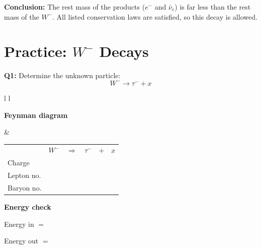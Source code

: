 \documentclass[12pt]{article}
\begin{document}
\vspace{0.9cm}

\textbf{Conclusion:} The rest mass of the products ($e^-$ and $\bar{\nu}_e$) is far less than the rest mass of the $W^-$. 
All listed conservation laws are satisfied, so this decay is allowed.

\section*{Practice: $W^-$ Decays}


\textbf{Q1:} Determine the unknown particle:
\[
W^- \rightarrow \tau^- + x
\]

\vspace{0.5cm}

\begin{tabular}{l l}

\begin{minipage}[t]{0.46\textwidth}
\vspace{0pt}
\textbf{Feynman diagram}

\vspace{0.6cm}

\begin{tikzpicture}
\begin{feynman}
  \vertex (W) at (0,2) {};
  \vertex [coordinate] (v) at (3,2) {};

  \vertex (tau) at (4,4) {\(\tau^-\)};
  \vertex (x)   at (5,3) {\(x\)};

  \diagram*{
    (W) -- [boson, edge label=\(W^-\), momentum'={}] (v),
    (v) -- [fermion] (tau),
    (v) -- [fermion] (x),
  };
\end{feynman}
\end{tikzpicture}
\end{minipage}
&
\begin{minipage}[t]{0.50\textwidth}
\vspace{0pt}

\renewcommand{\arraystretch}{1.4}
\begin{tabular}{@{}l c c c c c@{}}
 & \(W^-\) & \(\Rightarrow\) & \(\tau^-\) & \(+\) & \(x\) \\
Charge &  &  &  &  &  \\
Lepton no. &  &  &  &  &  \\
Baryon no. &  &  &  &  &  \\
\end{tabular}

\vspace{0.6cm}

\textbf{Energy check}

Energy in $=$

Energy out $=$

\end{minipage}

\end{tabular}
\end{document}
